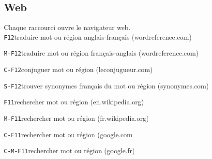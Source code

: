 \documentclass[10pt,landscape]{article}
\def\cm#1#2{{\tt#1}\dotfill#2\par}
\begin{document}
\begin{multicols}{3}
\subsection{Web}
Chaque raccourci ouvre le navigateur web.\\
\cm{F12}{traduire mot ou région anglais-français (wordreference.com)}
\cm{M-F12}{traduire mot ou région français-anglais (wordreference.com)}
\cm{C-F12}{conjuguer mot ou région (leconjugueur.com)}
\cm{S-F12}{trouver synonymes français du mot ou région (synonymes.com)}
\cm{F11}{rechercher mot ou région (en.wikipedia.org)}
\cm{M-F11}{rechercher mot ou région (fr.wikipedia.org)}
\cm{C-F11}{rechercher mot ou région (google.com}
\cm{C-M-F11}{rechercher mot ou région (google.fr)}




\end{multicols}
\end{document}
